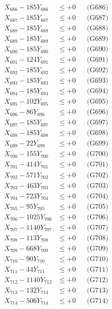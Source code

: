 \documentclass[a4paper,10pt]{article}
\begin{document}
{\begin{align}
X_{686} - 185Y_{686} &\leq +0 && \text{(G686)} \\
X_{687} - 185Y_{687} &\leq +0 && \text{(G687)} \\
X_{688} - 185Y_{688} &\leq +0 && \text{(G688)} \\
X_{689} - 185Y_{689} &\leq +0 && \text{(G689)} \\
X_{690} - 185Y_{690} &\leq +0 && \text{(G690)} \\
\allowbreak
X_{691} - 124Y_{691} &\leq +0 && \text{(G691)} \\
X_{692} - 185Y_{692} &\leq +0 && \text{(G692)} \\
X_{693} - 185Y_{693} &\leq +0 && \text{(G693)} \\
X_{694} - 185Y_{694} &\leq +0 && \text{(G694)} \\
X_{695} - 102Y_{695} &\leq +0 && \text{(G695)} \\
X_{696} - 86Y_{696} &\leq +0 && \text{(G696)} \\
X_{697} - 185Y_{697} &\leq +0 && \text{(G697)} \\
X_{698} - 185Y_{698} &\leq +0 && \text{(G698)} \\
X_{699} - 22Y_{699} &\leq +0 && \text{(G699)} \\
X_{700} - 155Y_{700} &\leq +0 && \text{(G700)} \\
\allowbreak
X_{701} - 414Y_{701} &\leq +0 && \text{(G701)} \\
X_{702} - 571Y_{702} &\leq +0 && \text{(G702)} \\
X_{703} - 463Y_{703} &\leq +0 && \text{(G703)} \\
X_{704} - 723Y_{704} &\leq +0 && \text{(G704)} \\
X_{705} - 95Y_{705} &\leq +0 && \text{(G705)} \\
X_{706} - 1025Y_{706} &\leq +0 && \text{(G706)} \\
X_{707} - 1140Y_{707} &\leq +0 && \text{(G707)} \\
X_{708} - 113Y_{708} &\leq +0 && \text{(G708)} \\
X_{709} - 668Y_{709} &\leq +0 && \text{(G709)} \\
X_{710} - 90Y_{710} &\leq +0 && \text{(G710)} \\
\allowbreak
X_{711} - 44Y_{711} &\leq +0 && \text{(G711)} \\
X_{712} - 1140Y_{712} &\leq +0 && \text{(G712)} \\
X_{713} - 132Y_{713} &\leq +0 && \text{(G713)} \\
X_{714} - 506Y_{714} &\leq +0 && \text{(G714)} \\

\end{align}}
\end{document}
